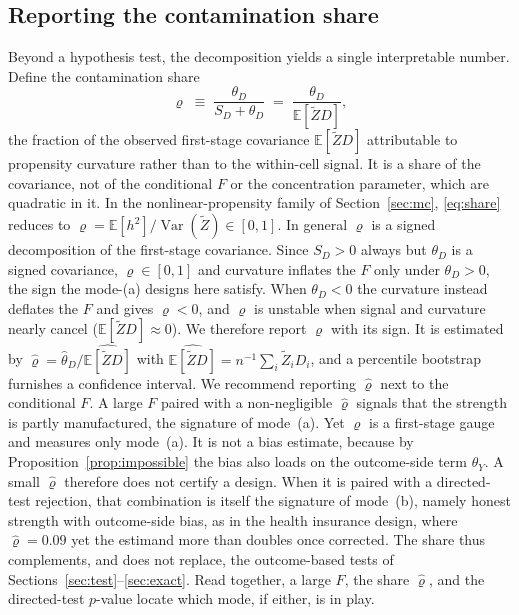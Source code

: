 \documentclass[preprint,11pt,authoryear]{elsarticle}
\theoremstyle{definition}
\newcommand{\E}{\mathbb{E}}
\newcommand{\Var}{\operatorname{Var}}
\newcommand{\Ztil}{\tilde{Z}}
\begin{document}
\subsection{Reporting the contamination share}\label{sec:share}
Beyond a hypothesis test, the decomposition yields a single interpretable number.
Define the contamination share
\begin{equation}\label{eq:share}
\varrho\;\equiv\;\frac{\theta_D}{S_D+\theta_D}\;=\;\frac{\theta_D}{\E[\Ztil D]},
\end{equation}
the fraction of the observed first-stage covariance $\E[\Ztil D]$
attributable to propensity curvature rather than to the within-cell signal. It is a
share of the covariance, not of the conditional $F$ or the concentration parameter,
which are quadratic in it. In the nonlinear-propensity family of
Section~\ref{sec:mc}, \eqref{eq:share} reduces to
$\varrho=\E[h^2]/\Var(\Ztil)\in[0,1]$. In general $\varrho$ is a signed
decomposition of the first-stage covariance. Since $S_D>0$ always but $\theta_D$ is a
signed covariance, $\varrho\in[0,1]$ and curvature inflates the $F$ only under
$\theta_D>0$, the sign the mode-(a) designs here satisfy. When $\theta_D<0$ the
curvature instead deflates the $F$ and gives $\varrho<0$, and $\varrho$ is unstable when
signal and curvature nearly cancel ($\E[\Ztil D]\approx0$). We therefore report $\varrho$
with
its sign. It is estimated by
$\hat\varrho=\hat\theta_D/\widehat{\E[\Ztil D]}$ with
$\widehat{\E[\Ztil D]}=n^{-1}\sum_i \Ztil_i D_i$, and a percentile bootstrap
furnishes a confidence interval. We recommend reporting $\hat\varrho$ next to the
conditional $F$. A large $F$ paired with a non-negligible $\hat\varrho$ signals
that the strength is partly manufactured, the signature of mode~(a). Yet $\varrho$ is a first-stage gauge and measures only mode~(a). It is not a
bias estimate, because by Proposition~\ref{prop:impossible} the bias also loads on
the outcome-side term $\theta_Y$. A small $\hat\varrho$ therefore does not certify a
design. When it is paired with a directed-test rejection, that combination is
itself the signature of mode~(b), namely honest strength with outcome-side bias, as
in the health insurance design, where $\hat\varrho=0.09$ yet the estimand more than
doubles once corrected.
The share thus complements, and does not replace, the outcome-based tests of
Sections~\ref{sec:test}--\ref{sec:exact}. Read together, a large $F$, the share
$\hat\varrho$, and the directed-test $p$-value locate which mode, if either, is in
play.

\end{document}
